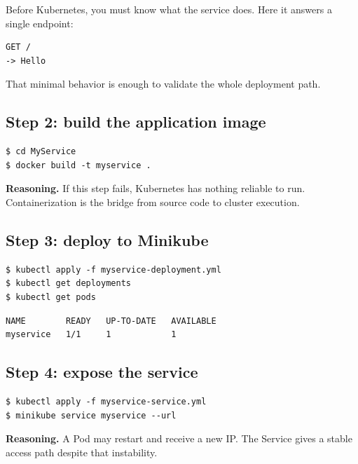 \documentclass[a4paper,11pt]{article}
\begin{document}
Before Kubernetes, you must know what the service does. Here it answers a single endpoint:

\begin{lstlisting}[style=terminal]
GET /
-> Hello
\end{lstlisting}

That minimal behavior is enough to validate the whole deployment path.

\subsection{Step 2: build the application image}

\begin{lstlisting}[style=terminal, caption={Docker workflow}]
$ cd MyService
$ docker build -t myservice .
\end{lstlisting}

\textbf{Reasoning.} If this step fails, Kubernetes has nothing reliable to run. Containerization is the bridge from source code to cluster execution.

\subsection{Step 3: deploy to Minikube}

\begin{lstlisting}[style=terminal, caption={Deployment workflow}]
$ kubectl apply -f myservice-deployment.yml
$ kubectl get deployments
$ kubectl get pods
\end{lstlisting}

\begin{lstlisting}[style=terminal, caption={Expected logical output}]
NAME        READY   UP-TO-DATE   AVAILABLE
myservice   1/1     1            1
\end{lstlisting}

\subsection{Step 4: expose the service}

\begin{lstlisting}[style=terminal, caption={NodePort exposure}]
$ kubectl apply -f myservice-service.yml
$ minikube service myservice --url
\end{lstlisting}

\textbf{Reasoning.} A Pod may restart and receive a new IP. The Service gives a stable access path despite that instability.
\end{document}
